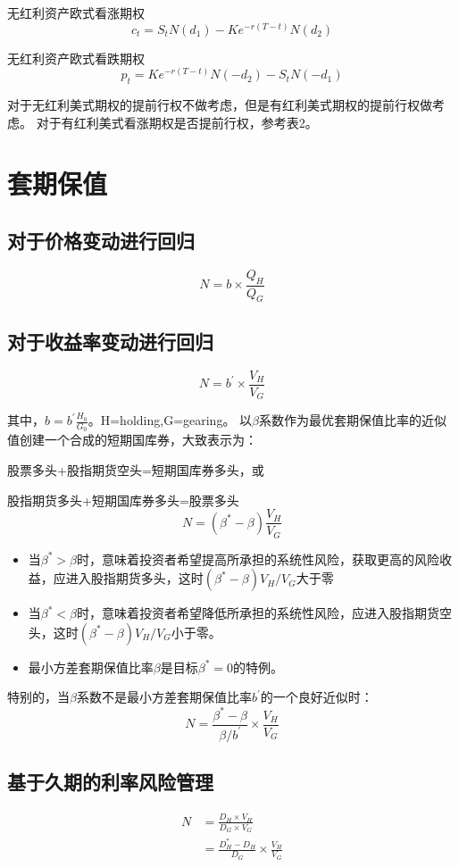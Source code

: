 \documentclass{article}
\begin{document}
无红利资产欧式看涨期权
\[c_t=S_tN(d_1)-Ke^{-r(T-t)}N(d_2)\]

无红利资产欧式看跌期权
\[p_t=Ke^{-r(T-t)}N(-d_2)-S_tN(-d_1)\]

对于无红利美式期权的提前行权不做考虑，但是有红利美式期权的提前行权做考虑。
对于有红利美式看涨期权是否提前行权，参考表2。

\clearpage
\section{套期保值}
\subsection{对于价格变动进行回归}
\[N=b\times\frac{Q_H}{Q_G}\]
\subsection{对于收益率变动进行回归}
\[N=b^{'}\times\frac{V_H}{V_G}\]

其中，$b=b^{'}\frac{H_0}{G_0}$。H=holding,G=gearing。
以$\beta$系数作为最优套期保值比率的近似值创建一个合成的短期国库券，大致表示为：

股票多头+股指期货空头=短期国库券多头，或

股指期货多头+短期国库券多头=股票多头
\[N=(\beta^{*}-\beta)\frac{V_H}{V_G}\]
\begin{itemize}
    \item 当$\beta^{*}>\beta$时，意味着投资者希望提高所承担的系统性风险，获取更高的风险收益，应进入股指期货多头，这时$(\beta^{*}-\beta)V_H/V_G$大于零
    \item 当$\beta^{*}<\beta$时，意味着投资者希望降低所承担的系统性风险，应进入股指期货空头，这时$(\beta^{*}-\beta)V_H/V_G$小于零。
    \item 最小方差套期保值比率$\beta$是目标$\beta^{*}=0$的特例。
\end{itemize}

特别的，当$\beta$系数不是最小方差套期保值比率$b^{'}$的一个良好近似时：
\[N=\frac{\beta^{*}-\beta}{\beta /b^{'}} \times \frac{V_H}{V_G}\]

\subsection{基于久期的利率风险管理}
\begin{align}
    N&=\frac{D_H\times V_H}{D_G\times V_G}\nonumber\\
    &=\frac{D_H^{*}-D_H}{D_G}\times\frac{V_H}{V_G} \nonumber
\end{align}
\end{document}
